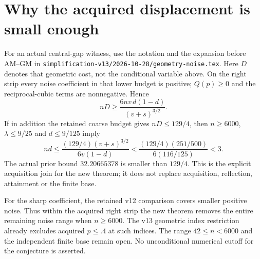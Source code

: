 \documentclass[11pt]{article}
\begin{document}
\section{Why the acquired displacement is small enough}
For an actual central-gap witness, use the notation and the expansion before
AM--GM in \texttt{simplification-v13/2026-10-28/geometry-noise.tex}.
Here $D$ denotes that geometric cost, not the conditional variable above.
On the right strip every noise coefficient in that lower budget is positive;
$Q(p)\ge0$ and the reciprocal-cubic terms are nonnegative. Hence
\[
 nD\ge\frac{6nv\,d(1-d)}{(v+s)^{3/2}}.
\]
If in addition the retained coarse budget gives $nD\le129/4$, then
$n\ge6000$, $\lambda\le9/25$ and $d\le9/125$ imply
\[
 nd\le\frac{(129/4)(v+s)^{3/2}}{6v(1-d)}
       <\frac{(129/4)(251/500)}{6(116/125)}<3.
\]
The actual prior bound $32.20665378$ is smaller than $129/4$.
This is the explicit acquisition join for the new theorem; it does not
replace acquisition, reflection, attainment or the finite base.

For the sharp coefficient, the retained v12 comparison covers smaller
positive noise. Thus within the acquired right strip the new theorem
removes the entire remaining noise range when $n\ge6000$. The v13 geometric
index restriction already excludes acquired $p\le.4$ at such indices.
The range $42\le n<6000$ and the independent finite base remain open.
No unconditional numerical cutoff for the conjecture is asserted.
\end{document}
